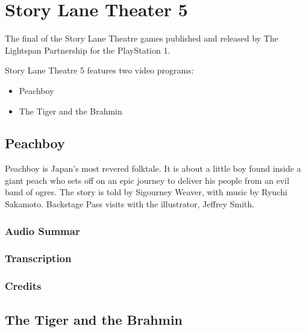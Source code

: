 \chapter{Story Lane Theater 5}


The final of the Story Lane Theatre games published and released by The Lightspan Partnership for the PlayStation 1.

Story Lane Theatre 5 features two video programs:

\begin{itemize}
    \item Peachboy
    \item The Tiger and the Brahmin
\end{itemize}

\clearpage
\newpage

\section{Peachboy}

Peachboy is Japan's most revered folktale. It is about a little boy found inside a giant peach who sets off on an epic journey to deliver his people from an evil band of ogres. The story is told by Sigourney Weaver, with music by Ryuchi Sakamoto. Backstage Pass visits with the illustrator, Jeffrey Smith.

\subsection{Audio Summar}

\subsection{Transcription}

\subsection{Credits}

\section{The Tiger and the Brahmin}

